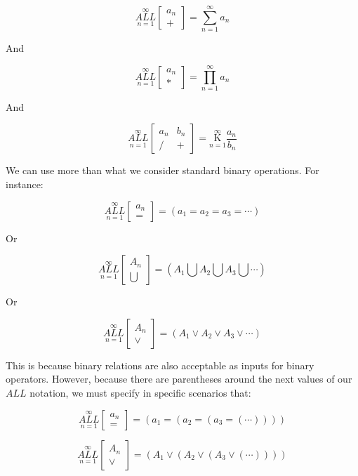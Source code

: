 \documentclass{article}
\begin{document}
$$\underset{n=1}{\overset{\infty}{ALL}} \begin{bmatrix}
a_n \\
+
\end{bmatrix}= \underset{n=1}{\overset{\infty}{\sum}} a_n$$

And

$$\underset{n=1}{\overset{\infty}{ALL}} \begin{bmatrix}
a_n \\
*
\end{bmatrix}= \underset{n=1}{\overset{\infty}{\prod}} a_n$$

And

$$\underset{n=1}{\overset{\infty}{ALL}} \begin{bmatrix}
a_n & b_n \\
/ & +
\end{bmatrix}= \underset{n=1}{\overset{\infty}{\mathrm K}} \frac{a_n}{b_n}$$

We can use more than what we consider standard binary operations. For instance:

$$\underset{n=1}{\overset{\infty}{ALL}} \begin{bmatrix}
a_n \\
=
\end{bmatrix} = (a_1=a_2=a_3=\cdots)$$

Or

$$\underset{n=1}{\overset{\infty}{ALL}} \begin{bmatrix}
A_n \\
\bigcup
\end{bmatrix} = (A_1 \bigcup A_2 \bigcup A_3 \bigcup \cdots)$$

Or

$$\underset{n=1}{\overset{\infty}{ALL}} \begin{bmatrix}
A_n \\
\vee
\end{bmatrix} = (A_1 \vee A_2 \vee A_3 \vee \cdots)$$

This is because binary relations are also acceptable as inputs for binary operators. However, because there are parentheses around the next values of our $ALL$ notation, we must specify in specific scenarios that:

$$\underset{n=1}{\overset{\infty}{ALL}} \begin{bmatrix}
a_n \\
=
\end{bmatrix} = (a_1=(a_2=(a_3=(\cdots))))$$

$$\underset{n=1}{\overset{\infty}{ALL}} \begin{bmatrix}
A_n \\
\vee
\end{bmatrix} = (A_1 \vee (A_2 \vee (A_3 \vee (\cdots))))$$
\end{document}
